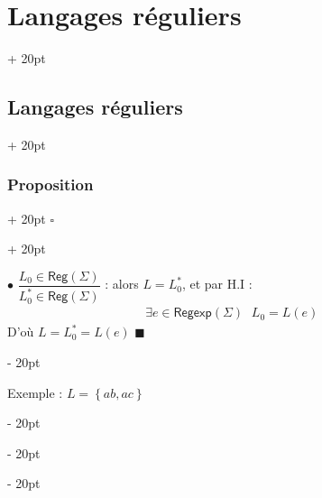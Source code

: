 \documentclass[a4paper, 12pt, twoside]{article}
\newcommand{\set}[1]{\left\{ #1 \right\}}
\newcommand{\ind}[1][20pt]{\advance\leftskip + #1}
\newcommand{\deind}[1][20pt]{\advance\leftskip - #1}
\newenvironment{indt}[2][20pt]{#2 \par \ind[#1]}{\par \deind} %
\newenvironment{proof}[1][{}]{\begin{indt}{$\square$ #1}}{$\blacksquare$ \end{indt}}
\newcommand{\Reg}{\mathsf{Reg}}
\newcommand{\Regexp}{\mathsf{Regexp}}
\begin{document}
\begin{indt}{\section{Langages réguliers}}
\begin{indt}{\subsection{Langages réguliers}}
\begin{indt}{\subsubsection{Proposition}}
\begin{proof}
                    \vspace{6pt}
                    
                    $\bullet$ $\dfrac{L_0 \in \Reg(\Sigma)}{L_0^* \in \Reg(\Sigma)}$ : alors $L = L_0^*$, et par H.I :
                    \[
                        \exists e \in \Regexp(\Sigma)\
                        \begin{array}{|l}
                            L_0 = L(e)
                        \end{array}
                    \]
                    D'où $L = L_0^* = L(e)$
                \end{proof}

                \vspace{12pt}
                
                Exemple : $L = \set{ab, ac}$


\end{indt}
\end{indt}
\end{indt}
\end{document}
